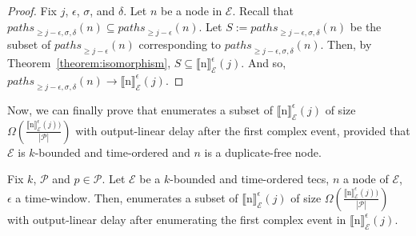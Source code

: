 \begin{proof}
  Fix $j$, $\epsilon$, $\sigma$, and $\delta$. Let $n$ be a node in $\mathcal{E}$. Recall that ${paths}_{\ge j-\epsilon, \sigma, \delta}(n) \subseteq {paths}_{\ge j-\epsilon}(n)$. Let $S := {paths}_{\ge j-\epsilon, \sigma, \delta}(n)$ be the subset of ${paths}_{\ge j-\epsilon}(n)$ corresponding to ${paths}_{\ge j-\epsilon, \sigma, \delta}(n)$. Then, by Theorem~\ref{theorem:isomorphism}, $S \subseteq {\llbracket \text{n} \rrbracket}^{\epsilon}_{\mathcal{E}}(j)$. And so, ${paths}_{\ge j-\epsilon, \sigma, \delta}(n) \rightarrow {\llbracket \text{n} \rrbracket}^{\epsilon}_{\mathcal{E}}(j)$.
\end{proof}

Now, we can finally prove that  enumerates a subset of ${\llbracket \text{n} \rrbracket}^{\epsilon}_{\mathcal{E}}(j)$ of size $\Omega(\frac{{\llbracket \text{n} \rrbracket}^{\epsilon}_{\mathcal{E}}(j))}{|\mathcal{P}|})$ with output-linear delay after the first complex event, provided that $\mathcal{E}$ is $k$-bounded and time-ordered and $n$ is a duplicate-free node.

\begin{theorem}\label{theorem:enumeration:process}
  Fix $k$, $\mathcal{P}$ and $p \in \mathcal{P}$. Let $\mathcal{E}$ be a $k$-bounded and time-ordered \acrshort{tecs}, $n$ a node of $\mathcal{E}$, $\epsilon$ a time-window. Then,  enumerates a subset of ${\llbracket \text{n} \rrbracket}^{\epsilon}_{\mathcal{E}}(j)$ of size $\Omega(\frac{{\llbracket \text{n} \rrbracket}^{\epsilon}_{\mathcal{E}}(j))}{|\mathcal{P}|})$ with output-linear delay after enumerating the first complex event in ${\llbracket \text{n} \rrbracket}^{\epsilon}_{\mathcal{E}}(j)$.
\end{theorem}

